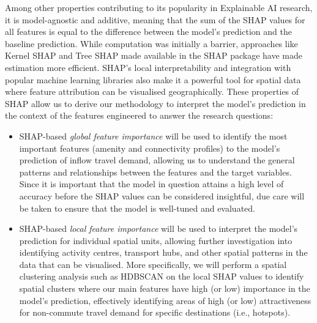 Among other properties contributing to its popularity in Explainable AI research, it is model-agnostic and additive, meaning that the sum of the SHAP values for all features is equal to the difference between the model's prediction and the baseline prediction. While computation was initially a barrier, approaches like Kernel SHAP and Tree SHAP made available in the SHAP package have made estimation more efficient. SHAP's local interpretability and integration with popular machine learning libraries also make it a powerful tool for spatial data where feature attribution can be visualised geographically. These properties of SHAP allow us to derive our methodology to interpret the model's prediction in the context of the features engineered to answer the research questions:

\begin{itemize}
\setlength\itemsep{0em} 
    \item SHAP-based \textit{global feature importance} will be used to identify the most important features (amenity and connectivity profiles) to the model's prediction of inflow travel demand, allowing us to understand the general patterns and relationships between the features and the target variables. Since it is important that the model in question attains a high level of accuracy before the SHAP values can be considered insightful, due care will be taken to ensure that the model is well-tuned and evaluated.
    \item SHAP-based \textit{local feature importance} will be used to interpret the model's prediction for individual spatial units, allowing further investigation into identifying activity centres, transport hubs, and other spatial patterns in the data that can be visualised. More specifically, we will perform a spatial clustering analysis such as HDBSCAN on the local SHAP values to identify spatial clusters where our main features have high (or low) importance in the model's prediction, effectively identifying areas of high (or low) attractiveness for non-commute travel demand for specific destinations (i.e., hotspots).
\end{itemize}

